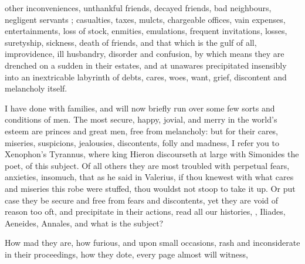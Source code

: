 other inconveniences, unthankful friends, decayed friends, bad neighbours,
negligent servants ; casualties, taxes, mulcts, chargeable offices, vain expenses,
entertainments, loss of stock, enmities, emulations, frequent invitations,
losses, suretyship, sickness, death of friends, and that which is the gulf of
all, improvidence, ill husbandry, disorder and confusion, by which means they
are drenched on a sudden in their estates, and at unawares precipitated
insensibly into an inextricable labyrinth of debts, cares, woes, want, grief,
discontent and melancholy itself.

I have done with families, and will now briefly run over some few sorts and
conditions of men. The most secure, happy, jovial, and merry in the world's
esteem are princes and great men, free from melancholy: but for their cares,
miseries, suspicions, jealousies, discontents, folly and madness, I refer you
to Xenophon's Tyrannus, where king Hieron discourseth at large with Simonides
the poet, of this subject. Of all others they are most troubled with perpetual
fears, anxieties, insomuch, that as he said in Valerius, if
thou knewest with what cares and miseries this robe were stuffed, thou wouldst
not stoop to take it up. Or put case they be secure and free from fears and
discontents, yet they are void of reason too oft, and
precipitate in their actions, read all our histories, , Iliades, Aeneides, Annales, and what is the subject?


How mad they are, how furious, and upon small occasions, rash and inconsiderate
in their proceedings, how they dote, every page almost will witness,


